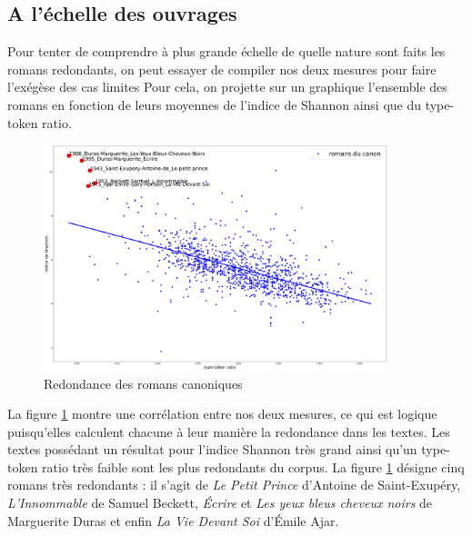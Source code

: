 \documentclass[a4paper,twoside,12pt]{book}
\begin{document}
\subsection{A l'échelle des ouvrages}

Pour tenter de comprendre à plus grande échelle de quelle nature sont faits les romans redondants, on peut essayer de compiler nos deux mesures pour faire l'exégèse des cas limites Pour cela, on projette sur un graphique l'ensemble des romans en fonction de leurs moyennes de l'indice de Shannon ainsi que du type-token ratio.

\bigskip
\begin{figure}[!ht]
    \centering
    \includegraphics[width=10cm]{img/14_canons_redondants.png}
    \caption{Redondance des romans canoniques}
    \label{canonsredondants}
\end{figure}
\bigskip

La figure \ref{canonsredondants} montre une corrélation entre nos deux mesures, ce qui est logique puisqu'elles calculent chacune à leur manière la redondance dans les textes. Les textes possédant un résultat pour l'indice Shannon très grand ainsi qu'un type-token ratio très faible sont les plus redondants du corpus. La figure \ref{canonsredondants} désigne cinq romans très redondants : il s'agit de \og\textit{Le Petit Prince}\fg{} d'Antoine de Saint-Exupéry, \og\textit{L'Innommable}\fg{} de Samuel Beckett, \og\textit{Écrire}\fg{} et \og\textit{Les yeux bleus cheveux noirs}\fg{} de Marguerite Duras et enfin \og\textit{La Vie Devant Soi}\fg{} d'Émile Ajar.
\end{document}
